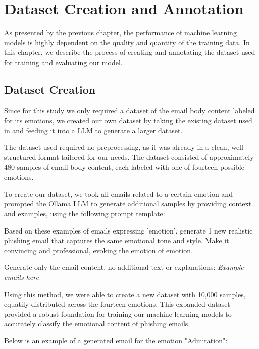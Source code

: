 \chapter{Dataset Creation and Annotation}

As presented by the previous chapter, the performance of machine learning models is highly dependent on the quality and quantity of the training data. In this chapter, we describe the process of creating and annotating the dataset used for training and evaluating our model.

\section{Dataset Creation}

Since for this study we only required a dataset of the email body content labeled for its emotions, we created our own dataset by taking the existing dataset used in \cite{Fernandes2024} and feeding it into a \ac{LLM} to generate a larger dataset. 

The dataset used required no preprocessing, as it was already in a clean, well-structured format tailored for our needs. The dataset consisted of approximately 480 samples of email body content, each labeled with one of fourteen possible emotions.

To create our dataset, we took all emails related to a certain emotion and prompted the Ollama \ac{LLM} to generate additional samples by providing context and examples, using the following prompt template:

\begin{tcolorbox}[colback=gray!10, colframe=gray!60, title={Prompt Template}]
Based on these examples of emails expressing '{emotion}', generate 1 new realistic phishing email that captures the same emotional tone and style. Make it convincing and professional, evoking the emotion of {emotion}.

Generate only the email content, no additional text or explanations: \textit{Example emails here}
\end{tcolorbox}


Using this method, we were able to create a new dataset with 10,000 samples, equatily distributed across the fourteen emotions. This expanded dataset provided a robust foundation for training our machine learning models to accurately classify the emotional content of phishing emails.

Below is an example of a generated email for the emotion "Admiration":

